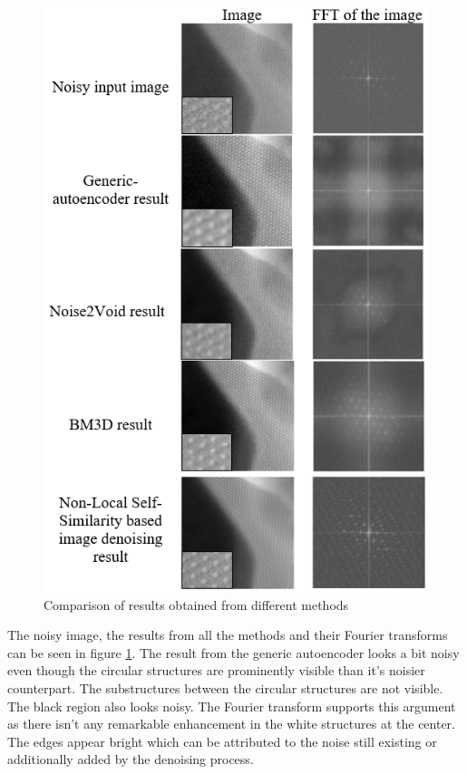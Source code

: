 \documentclass[fleqn,10pt]{wlscirep}
\begin{document}
\begin{figure}
	\centering
	\includegraphics[scale=1.1]{./imgs/comparison-1.png}
	\caption{Comparison of results obtained from different methods}
	\label{fig:comparison}
\end{figure}

The noisy image, the results from all the methods and their Fourier transforms can be seen in figure \ref{fig:comparison}. The result from the generic autoencoder looks a bit noisy even though the circular structures are prominently visible than it's noisier counterpart. The substructures between the circular structures are not visible. The black region also looks noisy. The Fourier transform supports this argument as there isn't any remarkable enhancement in the white structures at the center. The edges appear bright which can be attributed to the noise still existing or additionally added by the denoising process.
\end{document}
